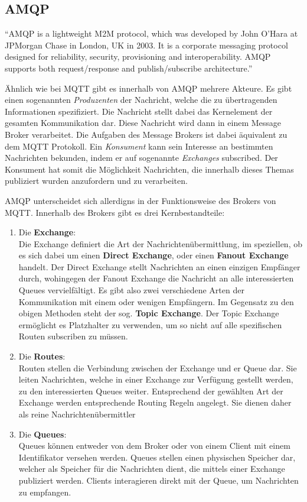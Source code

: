 \subsection{AMQP}

\begin{definition}
    \enquote{\ac{AMQP} is a lightweight M2M protocol, which was developed by John O’Hara at JPMorgan Chase in London, UK in 2003. It is a corporate messaging protocol designed for reliability, security, provisioning and interoperability. AMQP supports both request/response and publish/subscribe architecture.}\autocite{naik2017choice}
\end{definition}

Ähnlich wie bei \ac{MQTT} gibt es innerhalb von \ac{AMQP} mehrere Akteure. Es gibt einen sogenannten \textit{Produzenten} der Nachricht, welche die zu übertragenden Informationen spezifiziert. Die Nachricht stellt dabei das Kernelement der gesamten Kommunikation dar. Diese Nachricht wird dann in einem Message Broker verarbeitet. Die Aufgaben des Message Brokers ist dabei äquivalent zu dem \ac{MQTT} Protokoll. Ein \textit{Konsument} kann sein Interesse an bestimmten Nachrichten bekunden, indem er auf sogenannte \textit{Exchanges} subscribed. Der Konsument hat somit die Möglichkeit Nachrichten, die innerhalb dieses Themas publiziert wurden anzufordern und zu verarbeiten.

\ac{AMQP} unterscheidet sich allerdigns in der Funktionsweise des Brokers von \ac{MQTT}. Innerhalb des Brokers gibt es drei Kernbestandteile:
\begin{enumerate}
    \item Die \textbf{Exchange}:\\
    Die Exchange definiert die Art der Nachrichtenübermittlung, im speziellen, ob es sich dabei um einen \textbf{Direct Exchange}, oder einen \textbf{Fanout Exchange} handelt. Der Direct Exchange stellt Nachrichten an einen einzigen Empfänger durch, wohingegen der Fanout Exchange die Nachricht an alle interessierten Queues vervielfältigt. Es gibt also zwei verschiedene Arten der Kommunikation mit einem oder wenigen Empfängern. Im Gegensatz zu den obigen Methoden steht der sog. \textbf{Topic Exchange}. Der Topic Exchange ermöglicht es Platzhalter zu verwenden, um so nicht auf alle spezifischen Routen subscriben zu müssen.
    \item Die \textbf{Routes}:\\
    Routen stellen die Verbindung zwischen der Exchange und er Queue dar. Sie leiten Nachrichten, welche in einer Exchange zur Verfügung gestellt werden, zu den interessierten Queues weiter. Entsprechend der gewählten Art der Exchange werden entsprechende Routing Regeln angelegt. Sie dienen daher als reine Nachrichtenübermittler
    \item Die \textbf{Queues}:\\
    Queues können entweder von dem Broker oder von einem Client mit einem Identifikator versehen werden. Queues stellen einen physischen Speicher dar, welcher als Speicher für die Nachrichten dient, die mittels einer Exchange publiziert werden. Clients interagieren direkt mit der Queue, um Nachrichten zu empfangen.
\end{enumerate}

